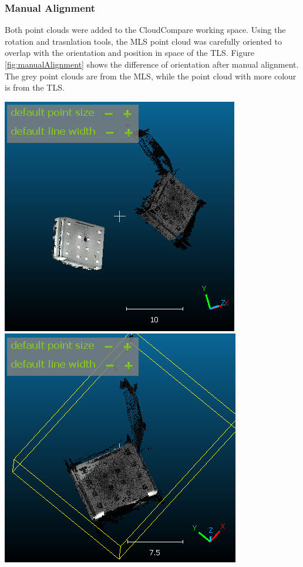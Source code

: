 \documentclass[man]{apa7}
\begin{document}
\subsubsection{Manual Alignment}
Both point clouds were added to the CloudCompare working space. Using the rotation and trasnlation tools, the MLS point cloud was carefully oriented to overlap with the orientation and position in space of the TLS. Figure \ref{fig:manualAlignment} shows the difference of orientation after manual alignment. The grey point clouds are from the MLS, while the point cloud with more colour is from the TLS.

\begin{minipage}{\linewidth}
  \includegraphics[height=\textheight/3,width=\textwidth/2]{figures/InitialAlignments.png}
  \includegraphics[height=\textheight/3,width=\textwidth/2]{figures/FinalAlignments.png}

\end{minipage}
\end{document}
